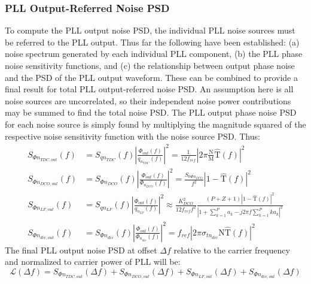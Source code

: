 \subsubsection{PLL Output-Referred Noise PSD}\label{final_pn_model}
To compute the PLL output noise PSD, the individual PLL noise sources must be referred to the PLL output. Thus far the following have been established: (a) noise spectrum generated by each individual PLL component, (b) the PLL phase noise sensitivity functions, and (c) the relationship between output phase noise and the PSD of the PLL output waveform. These can be combined to provide a final result for total PLL output-referred noise PSD. An assumption here is all noise sources are uncorrelated, so their independent noise power contributions may be summed to find the total noise PSD. The PLL output phase noise PSD for each noise source is simply found by multiplying the magnitude squared of the respective noise sensitivity function with the noise source PSD. Thus:
\begin{align}
	S_{\Phi n_{TDC,out}}(f) &= S_{qn_{TDC}}(f)\left|\frac{\Phi_{out}(f)}{q_{n_{TDC}}(f)}\right|^2 = \frac{1}{12f_{ref}}\left|2\pi\frac{\mathrm{N}}{\mathrm{M}}\hat{\mathrm{T}}(f)\right|^2\label{eq:tdc_pn_psd}\\
	S_{\Phi n_{DCO,out}}(f) &= S_{\Phi n_{DCO}}(f)\left|\frac{\Phi_{out}(f)}{\Phi_{n_{DCO}}(f)}\right|^2  = \frac{S_{0\Phi n_{DCO}}}{f^2}\left|1-\hat{\mathrm{T}}(f)\right|^2\\		
	S_{\Phi n_{LF,out}}(f) &= S_{q n_{LF}}(f)\left|\frac{\Phi_{out}(f)}{q_{n_{LF}}(f)}\right|^2 \approx \frac{K_{DCO}^2}{12f_{ref}f^2}\frac{(P+Z+1)|1-\hat{\mathrm{T}}(f)|^2}{\left|1+\sum_{k=1}^P a_k - j2\pi f\sum_{k=1}^P ka_k\right|^2}\\
	S_{\Phi n_{div,out}}(f) &= S_{\Phi n_{div}}(f)\left|\frac{\Phi_{out}(f)}{\Phi_{n_{div}}(f)}\right|^2 = f_{ref}\left|2\pi\sigma_{tn_{div}}\mathrm{N}\hat{\mathrm{T}}(f)\right|^2\label{eq:div_pn_psd}\
\end{align}
The final PLL output noise PSD at offset $\Delta f$ relative to the carrier frequency and normalized to carrier power of PLL will be:
\begin{equation}
	\mathcal{L}(\Delta f) = S_{\Phi n_{TDC,out}}(\Delta f) + S_{\Phi n_{DCO,out}}(\Delta f) + S_{\Phi n_{LF,out}}(\Delta f) + S_{\Phi n_{div,out}}(\Delta f)
\end{equation}

